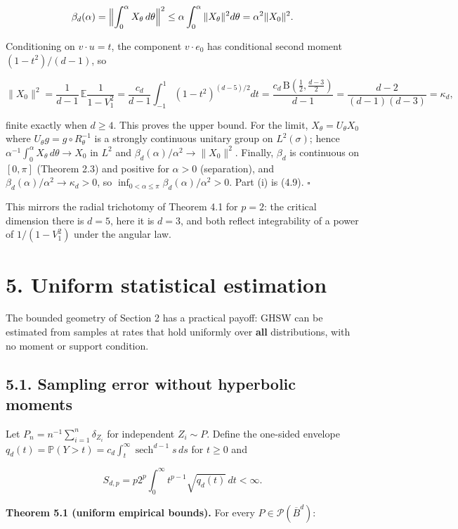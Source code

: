 \documentclass[
  british,
  11pt,
  a4paper,
]{article}
\begin{document}
\[
\beta_d(\alpha)=\Bigl\|\int_0^\alpha X_\theta\,d\theta\Bigr\|^2\leq\alpha\int_0^\alpha\|X_\theta\|^2d\theta=\alpha^2\|X_0\|^2 .
\]

Conditioning on \(v\cdot u=t\), the component \(v\cdot e_0\) has
conditional second moment \((1-t^2)/(d-1)\), so

\[
\|X_0\|^2=\frac{1}{d-1}\,\mathbb E\frac{1}{1-V_1^2}=\frac{c_d}{d-1}\int_{-1}^1(1-t^2)^{(d-5)/2}dt=\frac{c_d\,\mathrm B(\tfrac12,\tfrac{d-3}2)}{d-1}=\frac{d-2}{(d-1)(d-3)}=\kappa_d,
\]

finite exactly when \(d\geq4\). This proves the upper bound. For the
limit, \(X_\theta=U_\theta X_0\) where
\(U_\theta g=g\circ R_\theta^{-1}\) is a strongly continuous unitary
group on \(L^2(\sigma)\); hence
\(\alpha^{-1}\int_0^\alpha X_\theta\,d\theta\to X_0\) in \(L^2\) and
\(\beta_d(\alpha)/\alpha^2\to\|X_0\|^2\). Finally, \(\beta_d\) is
continuous on \([0,\pi]\) (Theorem 2.3) and positive for \(\alpha>0\)
(separation), and \(\beta_d(\alpha)/\alpha^2\to\kappa_d>0\), so
\(\inf_{0<\alpha\leq\pi}\beta_d(\alpha)/\alpha^2>0\). Part (i) is (4.9).
\(\square\)

This mirrors the radial trichotomy of Theorem 4.1 for \(p=2\): the
critical dimension there is \(d=5\), here it is \(d=3\), and both
reflect integrability of a power of \(1/(1-V_1^2)\) under the angular
law.

\section{5. Uniform statistical
estimation}\label{uniform-statistical-estimation}

The bounded geometry of Section 2 has a practical payoff: GHSW can be
estimated from samples at rates that hold uniformly over \textbf{all}
distributions, with no moment or support condition.

\subsection{5.1. Sampling error without hyperbolic
moments}\label{sampling-error-without-hyperbolic-moments}

Let \(P_n=n^{-1}\sum_{i=1}^n\delta_{Z_i}\) for independent
\(Z_i\sim P\). Define the one-sided envelope
\(q_d(t)=\mathbb P(Y>t)=c_d\int_t^\infty\operatorname{sech}^{d-1}s\,ds\)
for \(t\geq0\) and

\[
S_{d,p}=p2^p\int_0^\infty t^{p-1}\sqrt{q_d(t)}\,dt<\infty.
\tag{5.1}
\]

\textbf{Theorem 5.1 (uniform empirical bounds).} For every
\(P\in\mathcal P(\overline B^d)\):
\end{document}
